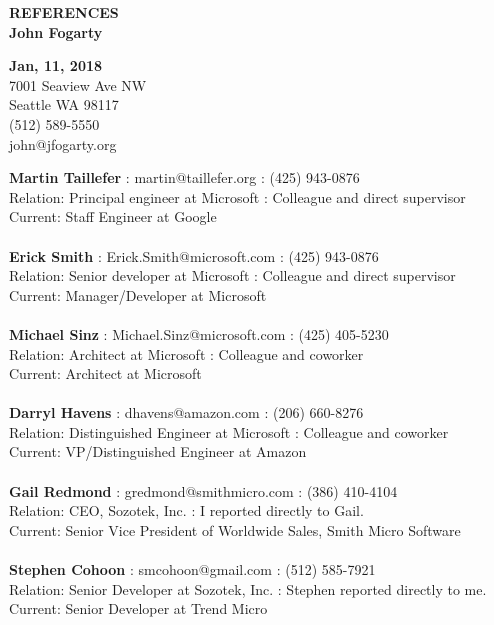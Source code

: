 \documentclass[10pt,letterpaper]{article}
\begin{document}

\begin{center}
	{\Large \textbf{REFERENCES
			\\
			\vspace*{4mm}
			John Fogarty}}
\end{center}

\begin{flushright}
	\textbf{Jan, 11, 2018}\\
	7001 Seaview Ave NW\\
	Seattle WA 98117\\
	(512) 589-5550\\
	john@jfogarty.org\\	
\end{flushright}


\vspace{0.7in}
\setlength{\parindent}{0pt}

\textbf{Martin Taillefer} : martin@taillefer.org : (425) 943-0876\\
Relation: Principal engineer at Microsoft : Colleague and direct supervisor\\
Current: Staff Engineer at Google
\\
\\

\textbf{Erick Smith} : Erick.Smith@microsoft.com : (425) 943-0876\\
Relation: Senior developer at Microsoft : Colleague and direct supervisor\\
Current: Manager/Developer at Microsoft
\\
\\

\textbf{Michael Sinz} : Michael.Sinz@microsoft.com : (425) 405-5230\\
Relation: Architect at Microsoft : Colleague and coworker\\
Current: Architect at Microsoft
\\
\\

\textbf{Darryl Havens} : dhavens@amazon.com : (206) 660-8276\\
Relation: Distinguished Engineer at Microsoft : Colleague and coworker\\
Current: VP/Distinguished Engineer at Amazon
\\
\\

\textbf{Gail Redmond} : gredmond@smithmicro.com : (386) 410-4104\\
Relation: CEO, Sozotek, Inc. : I reported directly to Gail.\\
Current: Senior Vice President of Worldwide Sales, Smith Micro Software
\\
\\

\textbf{Stephen Cohoon} : smcohoon@gmail.com : (512) 585-7921\\
Relation: Senior Developer at Sozotek, Inc. : Stephen reported directly to me.\\
Current: Senior Developer at Trend Micro
\\
\end{document}
